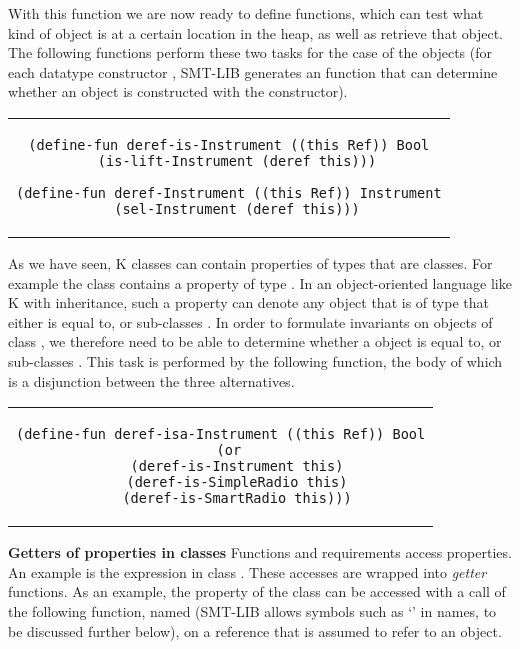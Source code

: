 \noindent With this function we are now ready to define functions,
which can test what kind of object is at a certain location in the
heap, as well as retrieve that object. The following functions perform
these two tasks for the case of the  objects (for
each datatype constructor , SMT-LIB generates an 
function that can determine whether an object is constructed with the
constructor).

\begin{center}
\begin{tabular}{c}
\begin{lstlisting}
(define-fun deref-is-Instrument ((this Ref)) Bool
  (is-lift-Instrument (deref this)))

(define-fun deref-Instrument ((this Ref)) Instrument
  (sel-Instrument (deref this)))
\end{lstlisting}
\end{tabular}
\end{center}

\noindent As we have seen, K classes can contain properties of types
that are classes. For example the  class contains a
property  of type . In an object-oriented
language like K with inheritance, such a property can denote any
object that is of type that either is equal to, or sub-classes
. In order to formulate invariants on objects of
class , we therefore need to be able to determine
whether a  object is equal to, or sub-classes
. This task is performed by the following function,
the body of which is a disjunction between the three alternatives.

\begin{center}
\begin{tabular}{c}
\begin{lstlisting}
(define-fun deref-isa-Instrument ((this Ref)) Bool
  (or
    (deref-is-Instrument this)
    (deref-is-SimpleRadio this)
    (deref-is-SmartRadio this)))
\end{lstlisting}
\end{tabular}
\end{center}

\textbf{Getters of properties in classes} Functions and requirements
access properties. An example is the expression  in
class .  These accesses are wrapped into {\em getter}
functions. As an example, the  property of the class
 can be accessed with a call of the following
function, named  (SMT-LIB allows symbols such
as `\code{!}'  in names, to be discussed further below), on a
reference that is assumed to refer to an  object.

